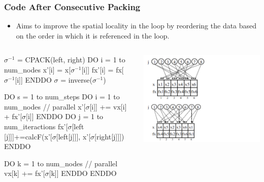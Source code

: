 \documentclass{beamer}
\newcommand{\emphh}[1]{\textcolor{CosGreen}{ #1}}
\newcommand{\mymath}[1]{$ #1 $}
\newcommand{\myindx}[1]{_{#1}}
\newcommand{\myindu}[1]{^{#1}}
\begin{document}
\begin{frame}[fragile,t]
  \frametitle{Code After Consecutive Packing}

\begin{itemize}
    \item Aims to improve the \emphh{spatial locality} in the loop
            by reordering the data based on the order in which it is
            referenced in the loop.
\end  {itemize}


\begin{columns}
\begin{colorcode}
\mymath{\sigma\myindu{-1}} = CPACK(left, right)
DO i = 1 to num_nodes
   x'[i] =  x[\mymath{\sigma\myindu{-1}}[i]]
  fx'[i] = fx[\mymath{\sigma\myindu{-1}}[i]]
ENDDO
\mymath{\sigma} = inverse(\mymath{\sigma\myindu{-1}})

DO s = 1 to num_steps
  DO i = 1 to num_nodes  // parallel
    \alert{x'[\mymath{\sigma}[i]]} += \emphh{vx[i]} + \alert{fx'[\mymath{\sigma}[i]]}
  ENDDO
  DO j = 1 to num_iteractions
    \emphh{fx'[\mymath{\sigma}[left [j]]]+=calcF(x'[\mymath{\sigma}[left[j]]],}
                            \emphh{x'[\mymath{\sigma}[right[j]]])}
  ENDDO

  DO k = 1 to num_nodes // parallel
    \emphh{vx[k]} += \alert{fx'[\mymath{\sigma}[k]]}
  ENDDO
ENDDO
\end{colorcode}
\includegraphics[width=53ex]{ParTeaserFigs/DataReordering1}
\end{columns}
\end{frame}
\end{document}
